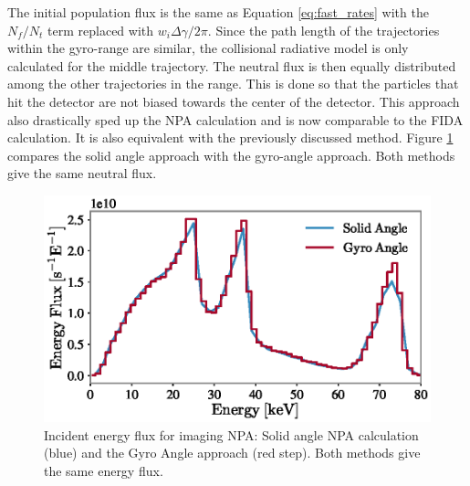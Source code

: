 The initial population flux is the same as Equation \ref{eq:fast_rates} with the $N_f/N_t$ term replaced with $w_i\Delta\gamma/2\pi$. Since the path length of the trajectories within the gyro-range are similar, the collisional radiative model is only calculated for the middle trajectory. The neutral flux is then equally distributed among the other trajectories in the range. This is done so that the particles that hit the detector are not biased towards the center of the detector. This approach also drastically sped up the NPA calculation and is now comparable to the FIDA calculation. It is also equivalent with the previously discussed method. Figure \ref{fig:npa_flux} compares the solid angle approach with the gyro-angle approach. Both methods give the same neutral flux.
\begin{figure}[h!]
    \centering
    \includegraphics[width=13cm]{figures/inpa_flux.eps}
    \caption{Incident energy flux for imaging NPA: Solid angle NPA calculation (blue) and the Gyro Angle approach (red step). Both methods give the same energy flux.}
    \label{fig:npa_flux}
\end{figure}

